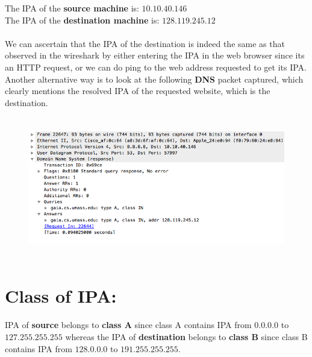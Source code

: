 \documentclass[]{report}
\begin{document}
The IPA of the \textbf{source machine} is: $10.10.40.146$ 
\\
The IPA of the \textbf{destination machine} is: $128.119.245.12$
\\ \\
We can ascertain that the IPA of the destination is indeed the same as that observed in the wireshark by either entering the IPA in the web browser since its an HTTP request, or we can do ping to the web address requested to get its IPA. \\
Another alternative way is to look at the following \textbf{DNS} packet captured, which clearly mentions the resolved IPA of the requested website, which is the destination.
\begin{figure}[H]
	\vspace{0pt}
	\includegraphics[height = 175pt, keepaspectratio]{Snapshots/q4_2.png}
\end{figure}

\section{Class of IPA:}
IPA of \textbf{source} belongs to \textbf{class A} since class A contains IPA from $0.0.0.0$ to $127.255.255.255$ whereas the IPA of \textbf{destination} belongs to \textbf{class B} since class B contains IPA from $128.0.0.0$ to $191.255.255.255$. 

\end{document}
